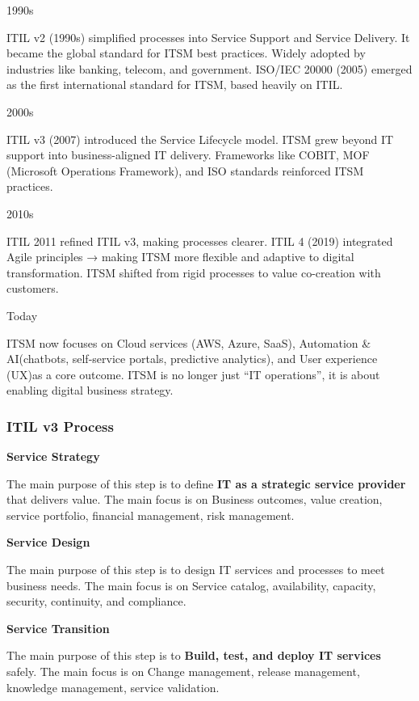 \noindent 1990s

ITIL v2 (1990s) simplified processes into Service Support and Service Delivery. It became the global standard for ITSM best practices. Widely adopted by industries like banking, telecom, and government. ISO/IEC 20000 (2005) emerged as the first international standard for ITSM, based heavily on ITIL.

\bigskip 

\noindent 2000s

ITIL v3 (2007) introduced the Service Lifecycle model. ITSM grew beyond IT support into business-aligned IT delivery. Frameworks like COBIT, MOF (Microsoft Operations Framework), and ISO standards reinforced ITSM practices.

\bigskip

\noindent 2010s

ITIL 2011 refined ITIL v3, making processes clearer. ITIL 4 (2019) integrated Agile principles → making ITSM more flexible and adaptive to digital transformation. ITSM shifted from rigid processes to value co-creation with customers.

\bigskip

\noindent Today

ITSM now focuses on Cloud services (AWS, Azure, SaaS), Automation \& AI(chatbots, self-service portals, predictive analytics), and User experience (UX)as a core outcome. ITSM is no longer just “IT operations”, it is about enabling digital business strategy.

\subsubsection{ITIL v3 Process}

\noindent\textbf{Service Strategy}

The main purpose of this step is to define\textbf{ IT as a strategic service provider} that delivers value. The main focus is on Business outcomes, value creation, service portfolio, financial management, risk management.

\noindent\textbf{Service Design}

The main purpose of this step is to design IT services and processes to meet business needs. The main focus is on Service catalog, availability, capacity, security, continuity, and compliance.

\noindent\textbf{Service Transition}

The main purpose of this step is to \textbf{Build, test, and deploy IT services} safely. The main focus is on Change management, release management, knowledge management, service validation.

